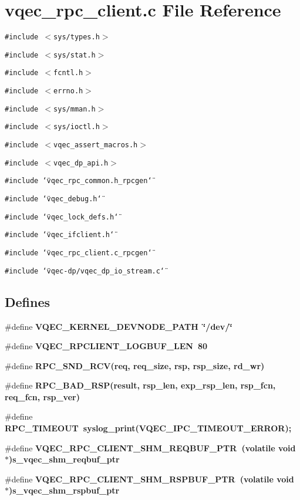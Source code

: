 \section{vqec\_\-rpc\_\-client.c File Reference}
\label{vqec__rpc__client_8c}
{\tt \#include $<$sys/types.h$>$}\par
{\tt \#include $<$sys/stat.h$>$}\par
{\tt \#include $<$fcntl.h$>$}\par
{\tt \#include $<$errno.h$>$}\par
{\tt \#include $<$sys/mman.h$>$}\par
{\tt \#include $<$sys/ioctl.h$>$}\par
{\tt \#include $<$vqec\_\-assert\_\-macros.h$>$}\par
{\tt \#include $<$vqec\_\-dp\_\-api.h$>$}\par
{\tt \#include \char`\"{}vqec\_\-rpc\_\-common.h\_\-rpcgen\char`\"{}}\par
{\tt \#include \char`\"{}vqec\_\-debug.h\char`\"{}}\par
{\tt \#include \char`\"{}vqec\_\-lock\_\-defs.h\char`\"{}}\par
{\tt \#include \char`\"{}vqec\_\-ifclient.h\char`\"{}}\par
{\tt \#include \char`\"{}vqec\_\-rpc\_\-client.c\_\-rpcgen\char`\"{}}\par
{\tt \#include \char`\"{}vqec-dp/vqec\_\-dp\_\-io\_\-stream.c\char`\"{}}\par
\subsection*{Defines}
\begin{CompactItemize}
\item 
\#define \bf{VQEC\_\-KERNEL\_\-DEVNODE\_\-PATH}~\char`\"{}/dev/\char`\"{}
\item 
\#define \bf{VQEC\_\-RPCLIENT\_\-LOGBUF\_\-LEN}~80
\item 
\#define \bf{RPC\_\-SND\_\-RCV}(req, req\_\-size, rsp, rsp\_\-size, rd\_\-wr)
\item 
\#define \bf{RPC\_\-BAD\_\-RSP}(result, rsp\_\-len, exp\_\-rsp\_\-len, rsp\_\-fcn, req\_\-fcn, rsp\_\-ver)
\item 
\#define \bf{RPC\_\-TIMEOUT}~syslog\_\-print(VQEC\_\-IPC\_\-TIMEOUT\_\-ERROR);
\item 
\#define \bf{VQEC\_\-RPC\_\-CLIENT\_\-SHM\_\-REQBUF\_\-PTR}~(volatile void $\ast$)\bf{s\_\-vqec\_\-shm\_\-reqbuf\_\-ptr}
\item 
\#define \bf{VQEC\_\-RPC\_\-CLIENT\_\-SHM\_\-RSPBUF\_\-PTR}~(volatile void $\ast$)\bf{s\_\-vqec\_\-shm\_\-rspbuf\_\-ptr}
\end{CompactItemize}
